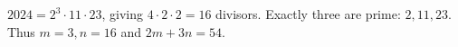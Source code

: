 $ 2024=2^3\cdot11\cdot23 $, giving $ 4\cdot2\cdot2=16 $ divisors. Exactly three are prime: $ 2,11,23 $. Thus $ m=3,n=16 $ and $\boxed{2m+3n=54}$.
